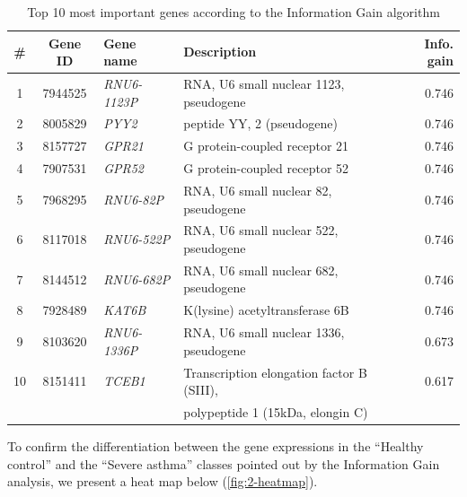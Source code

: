\begin{table}[htbp] \centering
  \caption{Top 10 most important genes according to the Information Gain algorithm}
   \label{tab:3-gene-info-gain}
  \begin{tabular}{ccllr}
    \hline
    \# & \textbf{Gene ID} & \textbf{Gene name}  & \textbf{Description}                      & \textbf{Info. gain} \\
    \hline
    1  & 7944525          & \textit{RNU6-1123P} & RNA, U6 small nuclear 1123, pseudogene    & 0.746               \\
    2  & 8005829          & \textit{PYY2}       & peptide YY, 2 (pseudogene)                & 0.746               \\
    3  & 8157727          & \textit{GPR21}      & G protein-coupled receptor 21             & 0.746               \\
    4  & 7907531          & \textit{GPR52}      & G protein-coupled receptor 52             & 0.746               \\
    5  & 7968295          & \textit{RNU6-82P}   & RNA, U6 small nuclear 82, pseudogene      & 0.746               \\
    6  & 8117018          & \textit{RNU6-522P}  & RNA, U6 small nuclear 522, pseudogene     & 0.746               \\
    7  & 8144512          & \textit{RNU6-682P}  & RNA, U6 small nuclear 682, pseudogene     & 0.746               \\
    8  & 7928489          & \textit{KAT6B}      & K(lysine) acetyltransferase 6B            & 0.746               \\
    9  & 8103620          & \textit{RNU6-1336P} & RNA, U6 small nuclear 1336, pseudogene    & 0.673               \\
    10 & 8151411          & \textit{TCEB1}      & Transcription elongation factor B (SIII), & 0.617               \\
       &                  &                     & polypeptide 1 (15kDa, elongin C)          &                     \\
    \hline
  \end{tabular}
\end{table} %

To confirm the differentiation between the gene expressions in the ``Healthy control'' and the ``Severe asthma'' classes pointed out by the Information Gain analysis, we present a heat map below (\autoref{fig:2-heatmap}).

